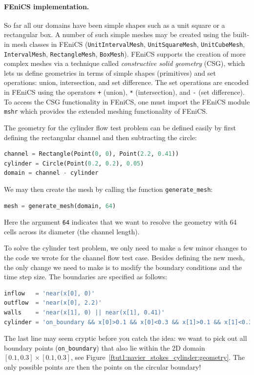 \documentclass[graybox,envcountchap,sectrefs,final]{svmonodo}
\begin{document}
\paragraph{FEniCS implementation.}
So far all our domains have been simple shapes such as a unit square or
a rectangular box. A number of such simple meshes may be created
using the built-in mesh classes in FEniCS
(\texttt{UnitIntervalMesh},
\texttt{UnitSquareMesh},
\texttt{UnitCubeMesh},
\texttt{IntervalMesh},
\texttt{RectangleMesh},
\texttt{BoxMesh}).
FEniCS supports the creation of more complex meshes via a technique
called \emph{constructive solid geometry} (CSG), which lets us define
geometries in terms of simple shapes (primitives) and set operations:
union, intersection, and set difference. The set operations are
encoded in FEniCS using the operators \texttt{+} (union), \texttt{*} (intersection),
and \texttt{-} (set difference). To access the CSG functionality in FEniCS,
one must import the FEniCS module \texttt{mshr} which provides the
extended meshing functionality of FEniCS.


The geometry for the cylinder flow test problem can be defined easily
by first defining the rectangular channel and then subtracting the
circle:

\begin{lstlisting}[language=Python,style=graycolor]
channel = Rectangle(Point(0, 0), Point(2.2, 0.41))
cylinder = Circle(Point(0.2, 0.2), 0.05)
domain = channel - cylinder
\end{lstlisting}
We may then create the mesh by calling the function \Verb!generate_mesh!:

\begin{lstlisting}[language=Python,style=graycolor]
mesh = generate_mesh(domain, 64)
\end{lstlisting}
Here the argument \texttt{64} indicates that we want to resolve the geometry
with 64 cells across its diameter (the channel length).


To solve the cylinder test problem, we only need to make a few minor
changes to the code we wrote for the channel flow test
case. Besides defining the new mesh, the only change we need to make
is to modify the boundary conditions and the time step size. The
boundaries are specified as follows:

\begin{lstlisting}[language=Python,style=graycolor]
inflow   = 'near(x[0], 0)'
outflow  = 'near(x[0], 2.2)'
walls    = 'near(x[1], 0) || near(x[1], 0.41)'
cylinder = 'on_boundary && x[0]>0.1 && x[0]<0.3 && x[1]>0.1 && x[1]<0.3'
\end{lstlisting}
The last line may seem cryptic before you catch the idea: we want to pick
out all boundary points (\Verb!on_boundary!) that also lie within the 2D
domain $[0.1,0.3]\times [0.1,0.3]$, see Figure~\ref{ftut1:navier_stokes_cylinder:geometry}. The only possible points are then the points on the
circular boundary!
\end{document}
